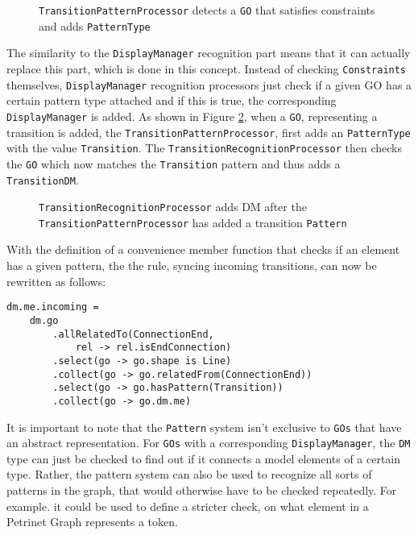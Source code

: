 \begin{figure}
  \centering
  
  \caption{\texttt{TransitionPatternProcessor} detects a \texttt{GO} that satisfies constraints and adds \texttt{PatternType}}
  \label{fig:kind-recognition}
\end{figure}

The similarity to the \texttt{DisplayManager} recognition part means that it can actually replace this part, which is done in this concept. Instead of checking \texttt{Constraints} themselves, \texttt{DisplayManager} recognition processors just check if a given GO has a certain pattern type attached and if this is true, the corresponding \texttt{DisplayManager} is added. As shown in Figure \ref{fig:Transition-Kind-Recognition}, when a \texttt{GO}, representing a transition is added, the \texttt{TransitionPatternProcessor}, first adds an \texttt{PatternType} with the value \texttt{Transition}. The \texttt{TransitionRecognitionProcessor} then checks the \texttt{GO} which now matches the \texttt{Transition} pattern and thus adds a \texttt{TransitionDM}.

\begin{figure}[ht]
  \centering
  
  \caption{\texttt{TransitionRecognitionProcessor} adds DM after the \texttt{TransitionPatternProcessor} has added a transition \texttt{Pattern}}
  \label{fig:Transition-Kind-Recognition}
\end{figure}

With the definition of a convenience member function that checks if an element has a given pattern, the the rule, syncing incoming transitions, can now be rewritten as follows:
\begin{lstlisting}[captionpos=b,caption={Improved incoming transition rule, that also filters for elements with a that match the \texttt{Transition} pattern.}]
dm.me.incoming = 
    dm.go
        .allRelatedTo(ConnectionEnd,
            rel -> rel.isEndConnection)
        .select(go -> go.shape is Line)
        .collect(go -> go.relatedFrom(ConnectionEnd))
        .select(go -> go.hasPattern(Transition))
        .collect(go -> go.dm.me)
\end{lstlisting}


It is important to note that the \texttt{Pattern} system isn't exclusive to \texttt{GOs} that have an abstract representation. For \texttt{GOs} with a corresponding \texttt{DisplayManager}, the \texttt{DM} type can just be checked to find out if it connects a model elements of a certain type. Rather, the pattern system can also be used to recognize all sorts of patterns in the graph, that would otherwise have to be checked repeatedly. For example. it could be used to define a stricter check, on what element in a Petrinet Graph represents a token.

